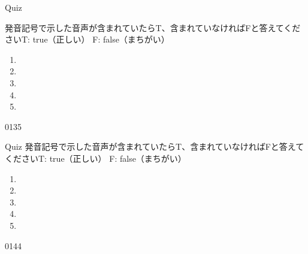 \documentclass[aspectratio=169,xcolor={dvipsnames,table}]{beamer}
\begin{document}
\begin{frame}[plain]{Quiz }

\large
発音記号で示した音声が含まれていたらT、含まれていなければFと答えてください\hfill{}{\scriptsize T: true（正しい）\hspace{5pt} F: false（まちがい）}
 \begin{enumerate}
  \item \mbox{}\hspace{1\zw}
  \item \mbox{}\hspace{1\zw}
  \item \mbox{}\visible<4->{T}\hspace{1\zw}
  \item \mbox{}\hspace{1\zw}
  \item \mbox{}\hspace{1\zw}
 \end{enumerate}

\hfill{\tiny 0135}\,{\scriptsize {}}

\end{frame}
\begin{frame}[plain]{Quiz }
\large
発音記号で示した音声が含まれていたらT、含まれていなければFと答えてください\hfill{}{\scriptsize T: true（正しい）\hspace{5pt} F: false（まちがい）}
 \begin{enumerate}
  \item \mbox{}\hspace{1\zw}
  \item \mbox{}\visible<3->{T}\hspace{1\zw}
  \item \mbox{}\hspace{1\zw}
  \item \mbox{}\hspace{1\zw}
  \item \mbox{}\hspace{1\zw}
 \end{enumerate}

\hfill{\tiny 0144}\,{\scriptsize {}}
\end{frame}
\end{document}
